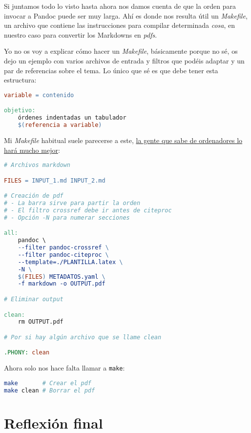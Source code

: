 Si juntamos todo lo visto hasta ahora nos damos cuenta de que la orden
para invocar a Pandoc puede ser muy larga. Ahí es donde nos resulta útil
un \emph{Makefile}, un archivo que contiene las instrucciones para
compilar determinada \emph{cosa}, en nuestro caso para convertir los
Markdowns en \emph{pdfs}.

Yo no os voy a explicar cómo hacer un \emph{Makefile}, básicamente
porque no sé, os dejo un ejemplo con varios archivos de entrada y
filtros que podéis adaptar y un par de referencias sobre el tema. Lo
único que sé es que debe tener esta estructura:

\begin{lstlisting}[language=make]
variable = contenido

objetivo:
    órdenes indentadas un tabulador
    $(referencia a variable)
\end{lstlisting}

Mi \emph{Makefile} habitual suele parecerse a este,
\href{https://gist.github.com/ekaitz-zarraga/f90f4c9c46a394e2048a\#file-makefile}{la
gente que sabe de ordenadores lo hará mucho mejor}:

\begin{lstlisting}[language=make]
# Archivos markdown

FILES = INPUT_1.md INPUT_2.md

# Creación de pdf
# - La barra sirve para partir la orden
# - El filtro crossref debe ir antes de citeproc
# - Opción -N para numerar secciones

all:
    pandoc \
    --filter pandoc-crossref \
    --filter pandoc-citeproc \
    --template=./PLANTILLA.latex \
    -N \
    $(FILES) METADATOS.yaml \
    -f markdown -o OUTPUT.pdf

# Eliminar output

clean:
    rm OUTPUT.pdf

# Por si hay algún archivo que se llame clean

.PHONY: clean
\end{lstlisting}

Ahora solo nos hace falta llamar a \lstinline!make!:

\begin{lstlisting}[language=bash]
make       # Crear el pdf
make clean # Borrar el pdf
\end{lstlisting}

\section{Reflexión final}

